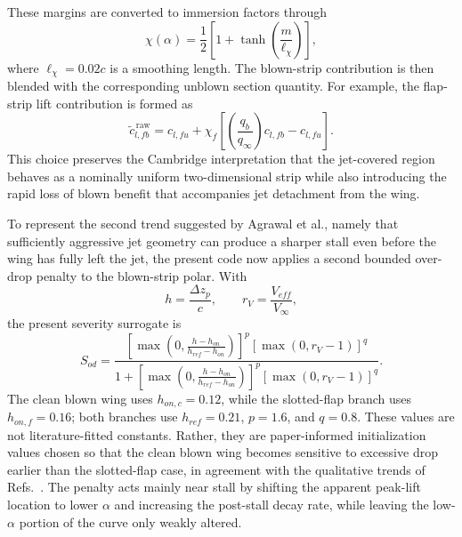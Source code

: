 \documentclass[conf]{new-aiaa}
\begin{document}
These margins are converted to immersion factors through
\begin{equation}
\chi(\alpha)
=
\frac{1}{2}\left[1+\tanh\left(\frac{m}{\ell_\chi}\right)\right],
\end{equation}
where \(\ell_\chi = 0.02c\) is a smoothing length. The blown-strip contribution is then blended with the corresponding unblown section quantity. For example, the flap-strip lift contribution is formed as
\begin{equation}
\tilde{c}_{l,fb}^{\,\mathrm{raw}}
=
c_{l,fu}
+
\chi_f
\left[
\left(\frac{q_b}{q_\infty}\right)c_{l,fb}
-
c_{l,fu}
\right].
\end{equation}
This choice preserves the Cambridge interpretation that the jet-covered region behaves as a nominally uniform two-dimensional strip while also introducing the rapid loss of blown benefit that accompanies jet detachment from the wing.

To represent the second trend suggested by Agrawal et al., namely that sufficiently aggressive jet geometry can produce a sharper stall even before the wing has fully left the jet, the present code now applies a second bounded over-drop penalty to the blown-strip polar.\cite{Agrawal2019} With
\begin{equation}
h = \frac{\Delta z_p}{c},
\qquad
r_V = \frac{V_{eff}}{V_\infty},
\end{equation}
the present severity surrogate is
\begin{equation}
S_{od}
=
\frac{
\left[\max\left(0,\frac{h-h_{on}}{h_{ref}-h_{on}}\right)\right]^p
\left[\max(0,r_V-1)\right]^q
}{
1+
\left[\max\left(0,\frac{h-h_{on}}{h_{ref}-h_{on}}\right)\right]^p
\left[\max(0,r_V-1)\right]^q
}.
\end{equation}
The clean blown wing uses \(h_{on,c}=0.12\), while the slotted-flap branch uses \(h_{on,f}=0.16\); both branches use \(h_{ref}=0.21\), \(p=1.6\), and \(q=0.8\). These values are not literature-fitted constants. Rather, they are paper-informed initialization values chosen so that the clean blown wing becomes sensitive to excessive drop earlier than the slotted-flap case, in agreement with the qualitative trends of Refs.~. The penalty acts mainly near stall by shifting the apparent peak-lift location to lower \(\alpha\) and increasing the post-stall decay rate, while leaving the low-\(\alpha\) portion of the curve only weakly altered.
\end{document}

